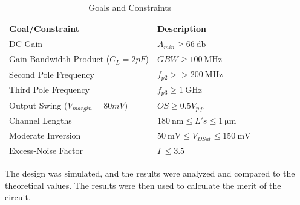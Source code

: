\begin{table}[h]
    \centering
    \caption{Goals and Constraints}
    \begin{tabularx}{\textwidth}{>{\centering\arraybackslash}X >{\centering\arraybackslash}X}
        \toprule
        \textbf{Goal/Constraint} & \textbf{Description}\\
        \midrule
        DC Gain & $A_{min}\geq \SI{66}{\decibel}$\\
        \midrule
        Gain Bandwidth Product ($C_L = 2pF$) & $GBW\geq\SI{100}{\mega\hertz}$ \\
        \midrule
        Second Pole Frequency & $f_{p2}>>\SI{200}{\mega\hertz}$ \\
        \midrule
        Third Pole Frequency & $f_{p3} \geq \SI{1}{\giga\hertz}$ \\
        \midrule
        Output Swing ($V_{margin}=80mV$) & $OS\geq 0.5 V_{p.p}$ \\
        \midrule
        Channel Lengths & $\SI{180}{\nano\meter} \leq L's \leq \SI{1}{\micro\meter} $ \\
        \midrule
        Moderate Inversion & $\SI{50}{\milli\volt} \leq V_{DSat} \leq \SI{150}{\milli\volt}$ \\
        \midrule
        Excess-Noise Factor & $\Gamma \leq 3.5 $\\
        \bottomrule
    \end{tabularx}
    \label{tab:goals}
\end{table}

The design was simulated, and the results were analyzed and compared to the theoretical values. The results were then used to calculate the merit of the circuit.

\pagebreak

